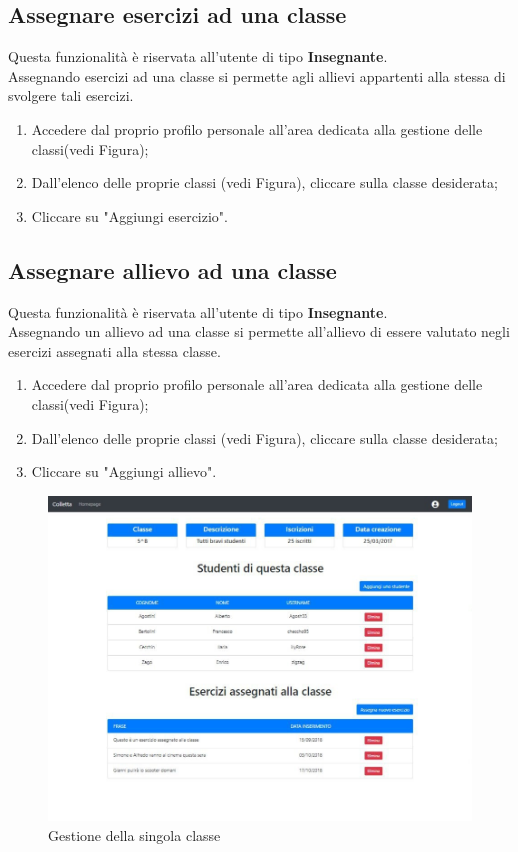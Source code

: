 \documentclass[11pt,a4paper]{article}
\begin{document}
{	\subsection{Assegnare esercizi ad una classe}
			Questa funzionalità è riservata all'utente di tipo \textbf{Insegnante}.\\
			Assegnando esercizi ad una classe si permette agli allievi appartenti alla stessa di svolgere tali esercizi.
			\begin{enumerate}
				\item Accedere dal proprio profilo personale all'area dedicata alla gestione delle classi(vedi Figura);
				\item Dall'elenco delle proprie classi (vedi Figura), cliccare sulla classe desiderata;
				\item Cliccare su "Aggiungi esercizio".
			\end{enumerate}
		
		\subsection{Assegnare allievo ad una classe}
		Questa funzionalità è riservata all'utente di tipo \textbf{Insegnante}.\\
		Assegnando un allievo ad una classe si permette all'allievo di essere valutato negli esercizi assegnati alla stessa classe.
		\begin{enumerate}
			\item Accedere dal proprio profilo personale all'area dedicata alla gestione delle classi(vedi Figura);
			\item Dall'elenco delle proprie classi (vedi Figura), cliccare sulla classe desiderata;
			\item Cliccare su "Aggiungi allievo".
		\end{enumerate}
	
		\begin{figure}[h!]
		\centering
		\includegraphics[scale=0.65]{images/gestioneclasse.jpg}
		\caption{Gestione della singola classe}
	\end{figure}
			
}
\end{document}

